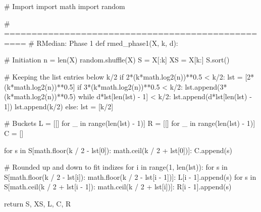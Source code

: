 \begin{python}
#   Import
import math
import random

# ==================================================
#   RMedian: Phase 1
def rmed_phase1(X, k, d):

    #   Initiation
    n = len(X)
    random.shuffle(X)
    S = X[:k]
    XS = X[k:]
    S.sort()

    #   Keeping the list entries below k/2
    if 2*(k*math.log2(n))**0.5 < k/2:
        lst = [2*(k*math.log2(n))**0.5]
        if 3*(k*math.log2(n))**0.5 < k/2:
            lst.append(3*(k*math.log2(n))**0.5)
            while d*lst[len(lst) - 1] < k/2:
                lst.append(d*lst[len(lst) - 1])
        lst.append(k/2)
    else:
        lst = [k/2]

    #   Buckets
    L = [[] for _ in range(len(lst) - 1)]
    R = [[] for _ in range(len(lst) - 1)]
    C = []

    for s in S[math.floor(k / 2 - lst[0]):
    		   math.ceil(k / 2 + lst[0])]:
        C.append(s)
	
	#	Rounded up and down to fit indizes
    for i in range(1, len(lst)):
        for s in S[math.floor(k / 2 - lst[i]):
        		   math.floor(k / 2 - lst[i - 1])]:
            L[i - 1].append(s)
        for s in S[math.ceil(k / 2 + lst[i - 1]):
        		   math.ceil(k / 2 + lst[i])]:
            R[i - 1].append(s)

    return S, XS, L, C, R
\end{python}